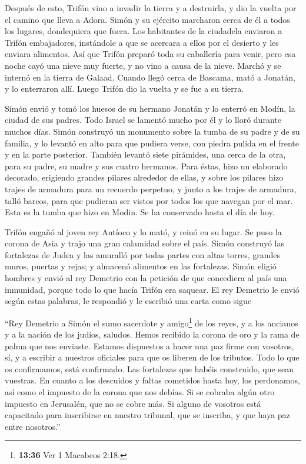  Después de esto, Trifón vino a invadir la tierra y a
destruirla, y dio la vuelta por el camino que lleva a Adora. Simón y su
ejército marcharon cerca de él a todos los lugares, dondequiera que
fuera.  Los habitantes de la ciudadela enviaron a Trifón
embajadores, instándole a que se acercara a ellos por el desierto y les
enviara alimentos.  Así que Trifón preparó toda su
caballería para venir, pero esa noche cayó una nieve muy fuerte, y no
vino a causa de la nieve. Marchó y se internó en la tierra de Galaad.
 Cuando llegó cerca de Bascama, mató a Jonatán, y lo
enterraron allí.  Luego Trifón dio la vuelta y se fue a
su tierra.

 Simón envió y tomó los huesos de su hermano Jonatán y lo
enterró en Modín, la ciudad de sus padres.  Todo Israel
se lamentó mucho por él y lo lloró durante muchos días. 
Simón construyó un monumento sobre la tumba de su padre y de su familia,
y lo levantó en alto para que pudiera verse, con piedra pulida en el
frente y en la parte posterior.  También levantó siete
pirámides, una cerca de la otra, para su padre, su madre y sus cuatro
hermanos.  Para éstas, hizo un elaborado decorado,
erigiendo grandes pilares alrededor de ellas, y sobre los pilares hizo
trajes de armadura para un recuerdo perpetuo, y junto a los trajes de
armadura, talló barcos, para que pudieran ser vistos por todos los que
navegan por el mar.  Esta es la tumba que hizo en Modin.
Se ha conservado hasta el día de hoy.

 Trifón engañó al joven rey Antíoco y lo mató,
 y reinó en su lugar. Se puso la corona de Asia y trajo
una gran calamidad sobre el país.  Simón construyó las
fortalezas de Judea y las amuralló por todas partes con altas torres,
grandes muros, puertas y rejas; y almacenó alimentos en las fortalezas.
 Simón eligió hombres y envió al rey Demetrio con la
petición de que concediera al país una inmunidad, porque todo lo que
hacía Trifón era saquear.  El rey Demetrio le envió según
estas palabras, le respondió y le escribió una carta como sigue

 ``Rey Demetrio a Simón el sumo sacerdote y
amigo\footnote{\textbf{13:36} Ver 1 Macabeos 2:18.} de los reyes, y a
los ancianos y a la nación de los judíos, saludos.  Hemos
recibido la corona de oro y la rama de palma que nos enviaste. Estamos
dispuestos a hacer una paz firme con vosotros, sí, y a escribir a
nuestros oficiales para que os liberen de los tributos. 
Todo lo que os confirmamos, está confirmado. Las fortalezas que habéis
construido, que sean vuestras.  En cuanto a los descuidos
y faltas cometidos hasta hoy, los perdonamos, así como el impuesto de la
corona que nos debías. Si se cobraba algún otro impuesto en Jerusalén,
que no se cobre más.  Si alguno de vosotros está
capacitado para inscribirse en nuestro tribunal, que se inscriba, y que
haya paz entre nosotros.''

